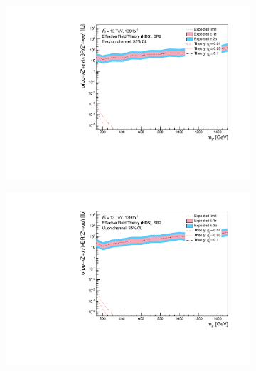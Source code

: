 \documentclass[12pt, a4paper]{book}
\begin{document}
\begin{figure}[!ht]
\begin{subfigure}[b]{0.49\textwidth}
   \end{subfigure}
   \hfill
   \begin{subfigure}[b]{0.49\textwidth}
      \centering
      \includegraphics[width=1\textwidth]{Limits/Model_independent/100-150/EFT_HDS/mass_exclusion_ee.pdf}
   \end{subfigure}
   \hfill
   \begin{subfigure}[b]{0.49\textwidth}
      \centering
      \includegraphics[width=1\textwidth]{Limits/Model_independent/100-150/EFT_HDS/mass_exclusion_uu.pdf}
   \end{subfigure}
   \hfill
	\begin{subfigure}[b]{0.49\textwidth}
      \centering

\end{subfigure}
\end{figure}
\end{document}
